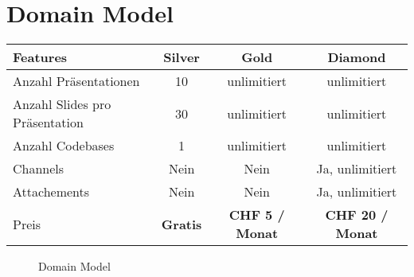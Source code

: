 \chapter{Domain Model}
\label{chap:domainmodel}

\begingroup
\setlength{\tabcolsep}{15pt} %
\renewcommand{\arraystretch}{1.2}
\begin{table}[h]
\centering
\begin{tabular}{l|c|c|c}
	\textbf{Features} 	&	\textbf{Silver} 	&	\textbf{Gold}	&	\textbf{Diamond} \\ \hline
	Anzahl Präsentationen	&	10	&	unlimitiert	&	unlimitiert \\ \hline
	Anzahl Slides pro Präsentation	&	30	&	unlimitiert	& unlimitiert \\ \hline
	Anzahl Codebases	&	1	& 	unlimitiert	&	unlimitiert \\ \hline
	Channels		&	Nein	&	Nein	& 	Ja, unlimitiert	\\ \hline
	Attachements		&	Nein	&	Nein	&	Ja, unlimitiert \\ \hline
	Preis	&	\textbf{Gratis}	&	\textbf{CHF 5 / Monat} 	& \textbf{CHF 20 / Monat}
\end{tabular}
\end{table}
\endgroup

\begin{figure}[htbp]
    \small 
    \caption{Domain Model}
\end{figure}